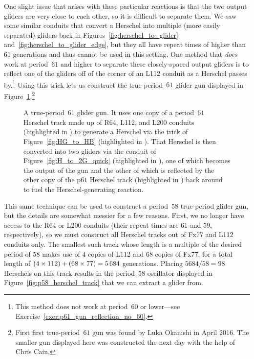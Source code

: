 One slight issue that arises with these particular reactions is that the two output gliders are very close to each other, so it is difficult to separate them. We saw some similar conduits that convert a Herschel into multiple (more easily separated) gliders back in Figures~\ref{fig:herschel_to_glider} and~\ref{fig:herschel_to_glider_edge}, but they all have repeat times of higher than $61$ generations and thus cannot be used in this setting. One method that \emph{does} work at period~$61$ and higher to separate these closely-spaced output gliders is to reflect one of the gliders off of the corner of an L112 conduit as a Herschel passes by.\footnote{This method does not work at period~$60$ or lower---see Exercise~\ref{exer:p61_gun_reflection_no_60}.} Using this trick lets us construct the true-period~$61$ glider gun displayed in Figure~\ref{fig:p61_gun}.\footnote{First first true-period~$61$ gun was found by Luka Okanishi in April 2016. The smaller gun displayed here was constructed the next day with the help of Chris Cain.}

\begin{figure}[!htb]
	\centering
	\caption{A true-period~$61$ glider gun. It uses one copy of a period~$61$ Herschel track made up of R64, L112, and L200 conduits (highlighted in ) to generate a Herschel via the trick of Figure~\ref{fig:HG_to_HB} (highlighted in ). That Herschel is then converted into two gliders via the conduit of Figure~\ref{fig:H_to_2G_quick} (highlighted in ), one of which becomes the output of the gun and the other of which is reflected by the other copy of the p$61$ Herschel track (highlighted in ) back around to fuel the Herschel-generating reaction.}\label{fig:p61_gun}
\end{figure}

This same technique can be used to construct a period~$58$ true-period glider gun, but the details are somewhat messier for a few reasons. First, we no longer have access to the R64 or L200 conduits (their repeat times are $61$ and $59$, respectively), so we must construct all Herschel tracks out of Fx77 and L112 conduits only. The smallest such track whose length is a multiple of the desired period of $58$ makes use of $4$ copies of L112 and $68$ copies of Fx77, for a total length of $(4 \times 112) + (68 \times 77) = 5{\,}684$ generations. Placing $5684/58 = 98$ Herschels on this track results in the period~$58$ oscillator displayed in Figure~\ref{fig:p58_herschel_track} that we can extract a glider from.

